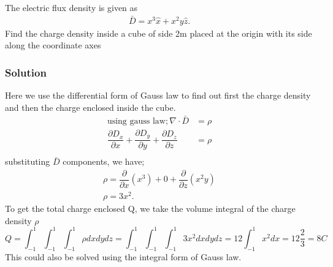 \begin{exmp}
The electric flux density is given as
\begin{align*}
\bar{D}=x^{3}\hat{x} + x^{2}y\hat{z}.
\end{align*}
Find the charge density inside a cube of side 2m placed at the origin with its side along the coordinate axes

\subsubsection*{Solution}
Here we use the differential form of Gauss law to find out first the charge density and then the charge enclosed inside the cube.\\
\begin{align*}
\text{using gauss law}; \nabla\cdot\bar{D}&=\rho\\
\dfrac{\partial D_{x}}{\partial x}+\dfrac{\partial D_{y}}{\partial y}+\dfrac{\partial 
D_{z}}{\partial z}&=\rho \\
\end{align*}
substituting $\bar{D}$ components, we have;
\begin{align*}
\rho= \dfrac{\partial}{\partial x}(x^{3})+ 0 +\dfrac{\partial }{\partial z}(x^{2}y)\\
\rho=3x^{2} .
\end{align*}
To get the total charge enclosed Q, we take the volume integral of the charge density $\rho$
\begin{dmath*}
Q=\int_{-1}^{1}\int_{-1}^{1}\int_{-1}^{1}\rho dxdydz
=\int_{-1}^{1}\int_{-1}^{1}\int_{-1}^{1}3x^{2}dxdydz
=12\int_{-1}^{1}x^{2}dx= 12\frac{2}{3}
= 8 C
\end{dmath*}
This could also be solved using the integral form of Gauss law.
\end{exmp}

